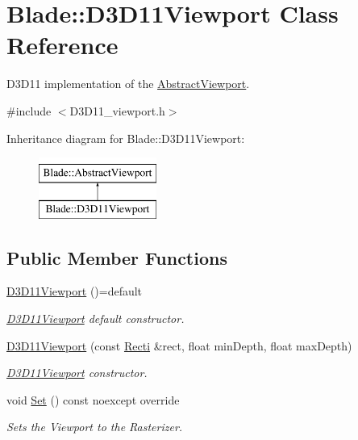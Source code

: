 \hypertarget{class_blade_1_1_d3_d11_viewport}{}\section{Blade\+:\+:D3\+D11\+Viewport Class Reference}
\label{class_blade_1_1_d3_d11_viewport}


D3\+D11 implementation of the \hyperlink{class_blade_1_1_abstract_viewport}{Abstract\+Viewport}.  




{\ttfamily \#include $<$D3\+D11\+\_\+viewport.\+h$>$}

Inheritance diagram for Blade\+:\+:D3\+D11\+Viewport\+:\begin{figure}[H]
\begin{center}
\leavevmode
\includegraphics[height=2.000000cm]{class_blade_1_1_d3_d11_viewport}
\end{center}
\end{figure}
\subsection*{Public Member Functions}
\begin{DoxyCompactItemize}
\item 
\mbox{\label{class_blade_1_1_d3_d11_viewport_aebaa19dcd0879142cd4626b8d326d945}} 
\hyperlink{class_blade_1_1_d3_d11_viewport_aebaa19dcd0879142cd4626b8d326d945}{D3\+D11\+Viewport} ()=default
\begin{DoxyCompactList}\small\item\em \hyperlink{class_blade_1_1_d3_d11_viewport}{D3\+D11\+Viewport} default constructor. \end{DoxyCompactList}\item 
\hyperlink{class_blade_1_1_d3_d11_viewport_aa834b9cb4de17876845f04a39bf79cd1}{D3\+D11\+Viewport} (const \hyperlink{namespace_blade_ac765e9c5c8205009994e4243d9d6f81c}{Recti} \&rect, float min\+Depth, float max\+Depth)
\begin{DoxyCompactList}\small\item\em \hyperlink{class_blade_1_1_d3_d11_viewport}{D3\+D11\+Viewport} constructor. \end{DoxyCompactList}\item 
\mbox{\label{class_blade_1_1_d3_d11_viewport_a4c87d9aaae3d96a377344ee9c40e6ceb}} 
void \hyperlink{class_blade_1_1_d3_d11_viewport_a4c87d9aaae3d96a377344ee9c40e6ceb}{Set} () const noexcept override
\begin{DoxyCompactList}\small\item\em Sets the Viewport to the Rasterizer. \end{DoxyCompactList}\end{DoxyCompactItemize}


